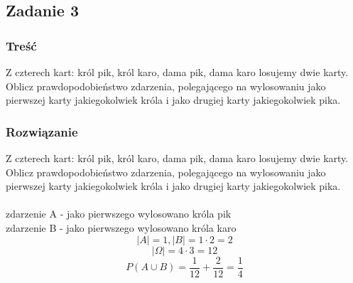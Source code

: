 \subsection{Zadanie 3}

\subsubsection*{Treść}
Z czterech kart: król pik, król karo, dama pik, dama karo losujemy dwie karty. Oblicz prawdopodobieństwo zdarzenia, polegającego na wylosowaniu jako pierwszej karty jakiegokolwiek króla i jako drugiej karty jakiegokolwiek pika.


\subsubsection*{Rozwiązanie}
Z czterech kart: król pik, król karo, dama pik, dama karo losujemy dwie karty. Oblicz prawdopodobieństwo zdarzenia, polegającego
na wylosowaniu jako pierwszej karty jakiegokolwiek króla i jako drugiej karty jakiegokolwiek pika. \\
\\
zdarzenie A - jako pierwszego wylosowano króla pik \\
zdarzenie B - jako pierwszego wylosowano króla karo \\
\[
|A| = 1 , |B| = 1 \cdot 2 = 2 
\]
\[
|\Omega| = 4 \cdot 3 = 12
\]
\[
P(A \cup B) = \frac{1}{12} + \frac{2}{12} = \frac{1}{4}
\]

